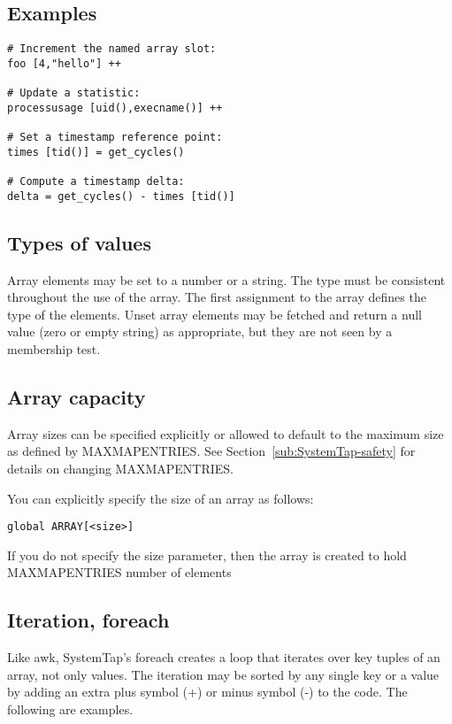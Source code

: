\documentclass[twoside,english]{article}
\newenvironment{vindent}
{\begin{list}{}{\setlength{\listparindent}{6pt}}
\item[]}
{\end{list}}
\begin{document}
\subsection{Examples}

\begin{vindent}
\begin{verbatim}
# Increment the named array slot:
foo [4,"hello"] ++

# Update a statistic:
processusage [uid(),execname()] ++

# Set a timestamp reference point:
times [tid()] = get_cycles()

# Compute a timestamp delta:
delta = get_cycles() - times [tid()]
\end{verbatim}
\end{vindent}

\subsection{Types of values}

Array elements may be set to a number or a string. The type must be consistent
throughout the use of the array. The first assignment to the array defines
the type of the elements. Unset array elements may be fetched and return
a null value (zero or empty string) as appropriate, but they are not seen
by a membership test.


\subsection{Array capacity}

Array sizes can be specified explicitly or allowed to default to the maximum
size as defined by MAXMAPENTRIES. See Section~\ref{sub:SystemTap-safety}
for details on changing MAXMAPENTRIES.

You can explicitly specify the size of an array as follows:

\begin{vindent}
\begin{verbatim}
global ARRAY[<size>]
\end{verbatim}
\end{vindent}
If you do not specify the size parameter, then the array is created to hold
MAXMAPENTRIES number of elements


\subsection{Iteration, foreach}
Like awk, SystemTap's foreach creates a loop that iterates over key tuples
of an array, not only values. The iteration may be sorted by any single key
or a value by adding an extra plus symbol (+) or minus symbol (-) to the
code. The following are examples.
\end{document}
